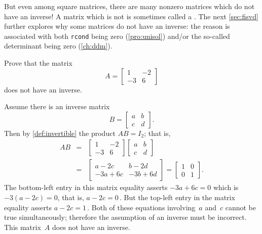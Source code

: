 But even among square matrices, there are many nonzero matrices which do not have an inverse!
A matrix which is not  is sometimes called a .
The next \autoref{sec:fisvd} further explores why some matrices do not have an inverse: the reason is associated with both \verb|rcond| being zero (\autoref{pro:unisol}) and/or the so-called determinant being zero (\autoref{ch:ddm}).

\begin{example}[no inverse] \label{eg:no2x2inv}
Prove that the matrix
\begin{equation*}
A=\begin{bmatrix} 1&-2\\-3&6 \end{bmatrix}
\end{equation*}
does not have an inverse.
\begin{solution} 
Assume there is an inverse matrix
\begin{equation*}
B=\begin{bmatrix} a&b\\c&d \end{bmatrix}.
\end{equation*}
Then by \autoref{def:invertible} the product \(AB=I_2\); that is,
\begin{eqnarray*}
AB&=&\begin{bmatrix} 1&-2\\-3&6 \end{bmatrix}
\begin{bmatrix} a&b\\c&d \end{bmatrix}
\\&=&\begin{bmatrix} a-2c&b-2d\\-3a+6c&-3b+6d \end{bmatrix}
=\begin{bmatrix} 1&0\\0&1 \end{bmatrix}.
\end{eqnarray*}
The bottom-left entry in this matrix equality asserts \(-3a+6c=0\) which is \(-3(a-2c)=0\), that is, \(a-2c=0\)\,.
But the top-left entry in the matrix equality asserts \(a-2c=1\)\,.
Both of these equations involving~\(a\) and~\(c\) cannot be true simultaneously; therefore the assumption of an inverse must be incorrect.
This matrix~\(A\) does not have an inverse.
\end{solution}
\end{example}



